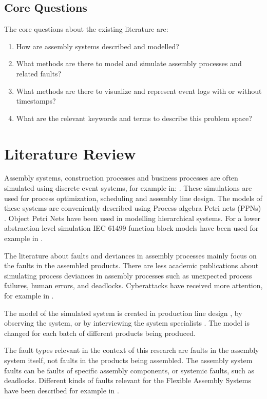 \documentclass[a4paper,10pt]{article}
\begin{document}
\subsection{Core Questions}

The core questions about the existing literature are:
\begin{enumerate}
 \item How are assembly systems described and modelled?
 \item What methods are there to model and simulate assembly processes and related faults?
 \item What methods are there to visualize and represent event logs with or without timestamps?
 \item What are the relevant keywords and terms to describe this problem space?
\end{enumerate}

\section{Literature Review}

Assembly systems, construction processes and business processes are often simulated using discrete event systems, for example in:
\cite{hlupic1998business,zhao2010efficient,kang2013active,rahnama2010fuzzy}. These simulations are used for process optimization\cite{sadeghi2008framework}, scheduling and
assembly line design. The models of these systems are conveniently described using Process algebra Petri nets (PPNs) \cite{falkman2007specification}. Object Petri Nets
have been used in modelling hierarchical systems\cite{wu2015method}. For a lower abstraction level simulation IEC 61499 function block models\cite{tc652004wg6} have been used
for example in \cite{rooker2008modeling}.

The literature about faults and deviances in assembly processes mainly focus on the faults in the assembled products.
There are less academic publications about simulating process deviances in assembly processes such as unexpected process failures, human errors, and deadlocks.
Cyberattacks have received more attention, for example in \cite{wu2015method}.

The model of the simulated system is created in production line design \cite{bullinger}, by observing the system, or by interviewing the system specialists \cite{montevechi2012using}.
The model is changed for each batch of different products being produced.

The fault types relevant in the context of this research are faults in the assembly system itself, not faults in the products being assembled.
The assembly system faults can be faults of specific assembly components, or systemic faults, such as deadlocks.
Different kinds of faults relevant for the Flexible Assembly Systems have been described for example in \cite{cong1997fault}.
\end{document}
